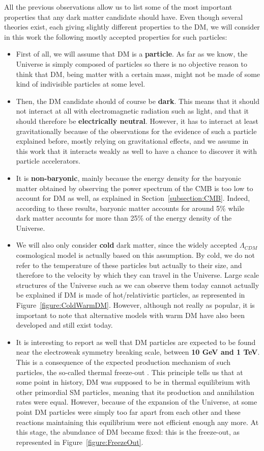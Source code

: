 \documentclass[a4paper, 10pt, openright]{report}
\begin{document}
All the previous observations allow us to list some of the most important properties that any dark matter candidate should have. Even though several theories exist, each giving slightly different properties to the \ac{DM}, we will consider in this work the following mostly accepted properties for such particles:
\begin{itemize}
\item First of all, we will assume that \ac{DM} is a \textbf{particle}. As far as we know, the Universe is simply composed of particles so there is no objective reason to think that \ac{DM}, being matter with a certain mass, might not be made of some kind of indivisible particles at some level.
\item Then, the \ac{DM} candidate should of course be \textbf{dark}. This means that it should not interact at all with electromagnetic radiation such as light, and that it should therefore be \textbf{electrically neutral}. However, it has to interact at least gravitationally because of the observations for the evidence of such a particle explained before, mostly relying on gravitational effects, and we assume in this work that it interacts weakly as well to have a chance to discover it with particle accelerators.
\item It is \textbf{non-baryonic}, mainly because the energy density for the baryonic matter obtained by observing the power spectrum of the \ac{CMB} is too low to account for \ac{DM} as well, as explained in Section~\ref{subsection:CMB}. Indeed, according to these results, baryonic matter accounts for around 5\% while dark matter accounts for more than 25\% of the energy density of the Universe. 
\item We will also only consider \textbf{cold} dark matter, since the widely accepted $\Lambda_{CDM}$ cosmological model is actually based on this assumption. By cold, we do not refer to the temperature of these particles but actually to their size, and therefore to the velocity by which they can travel in the Universe. Large scale structures of the Universe such as we can observe them today cannot actually be explained if \ac{DM} is made of hot/relativistic particles, as represented in Figure~\ref{figure:ColdWarmDM}. However, although not really as popular, it is important to note that alternative models with warm \ac{DM} have also been developed and still exist today.
\item It is interesting to report as well that \ac{DM} particles are expected to be found near the electroweak symmetry breaking scale, between \textbf{10 GeV and 1 TeV}. This is a consequence of the expected production mechanism of such particles, the so-called thermal freeze-out \cite{Freezeout1}. This principle tells us that at some point in history, \ac{DM} was supposed to be in thermal equilibrium with other primordial \ac{SM} particles, meaning that its production and annihilation rates were equal. However, because of the expansion of the Universe, at some point \ac{DM} particles were simply too far apart from each other and these reactions maintaining this equilibrium were not efficient enough any more. At this stage, the abundance of \ac{DM} became fixed: this is the freeze-out, as represented in Figure~\ref{figure:FreezeOut}.


\end{itemize}
\end{document}
